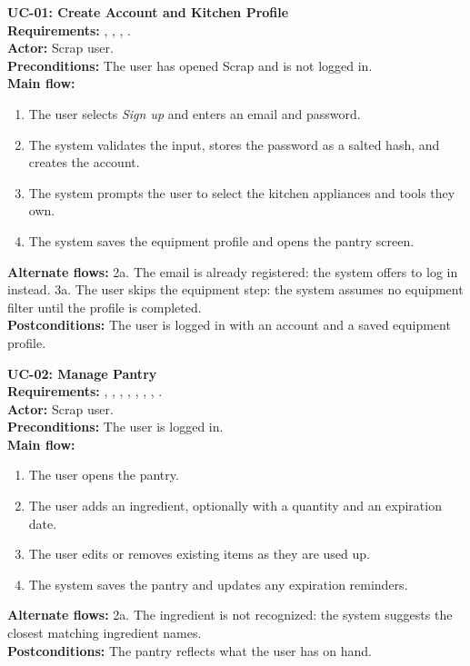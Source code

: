 \begin{sloppypar}

\medskip\noindent\textbf{UC-01: Create Account and Kitchen Profile}\\
\textbf{Requirements:} , , , .\\
\textbf{Actor:} Scrap user.\\
\textbf{Preconditions:} The user has opened Scrap and is not logged in.\\
\textbf{Main flow:}
\begin{enumerate}
\item The user selects \textit{Sign up} and enters an email and password.
\item The system validates the input, stores the password as a salted hash, and creates the account.
\item The system prompts the user to select the kitchen appliances and tools they own.
\item The system saves the equipment profile and opens the pantry screen.
\end{enumerate}
\textbf{Alternate flows:} 2a. The email is already registered: the system offers to log in instead. \quad 3a. The user skips the equipment step: the system assumes no equipment filter until the profile is completed.\\
\textbf{Postconditions:} The user is logged in with an account and a saved equipment profile.

\medskip\noindent\textbf{UC-02: Manage Pantry}\\
\textbf{Requirements:} , , , , , , , .\\
\textbf{Actor:} Scrap user.\\
\textbf{Preconditions:} The user is logged in.\\
\textbf{Main flow:}
\begin{enumerate}
\item The user opens the pantry.
\item The user adds an ingredient, optionally with a quantity and an expiration date.
\item The user edits or removes existing items as they are used up.
\item The system saves the pantry and updates any expiration reminders.
\end{enumerate}
\textbf{Alternate flows:} 2a. The ingredient is not recognized: the system suggests the closest matching ingredient names.\\
\textbf{Postconditions:} The pantry reflects what the user has on hand.


\end{sloppypar}
